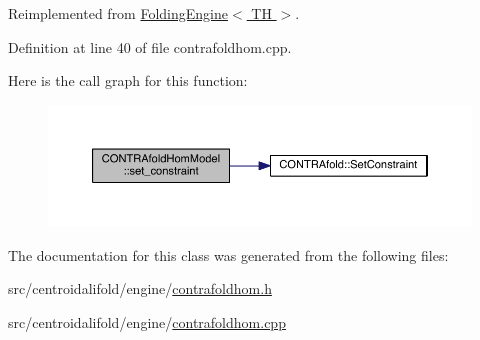 Reimplemented from \hyperlink{class_folding_engine_aa979adbd342b75eb947927e6ff7bcb8c}{Folding\+Engine$<$ T\+H $>$}.



Definition at line 40 of file contrafoldhom.\+cpp.



Here is the call graph for this function\+:
\nopagebreak
\begin{figure}[H]
\begin{center}
\leavevmode
\includegraphics[width=350pt]{class_c_o_n_t_r_afold_hom_model_af152e89d182c3371df6412a40fcc2b5e_cgraph}
\end{center}
\end{figure}




The documentation for this class was generated from the following files\+:\begin{DoxyCompactItemize}
\item 
src/centroidalifold/engine/\hyperlink{contrafoldhom_8h}{contrafoldhom.\+h}\item 
src/centroidalifold/engine/\hyperlink{contrafoldhom_8cpp}{contrafoldhom.\+cpp}\end{DoxyCompactItemize}
